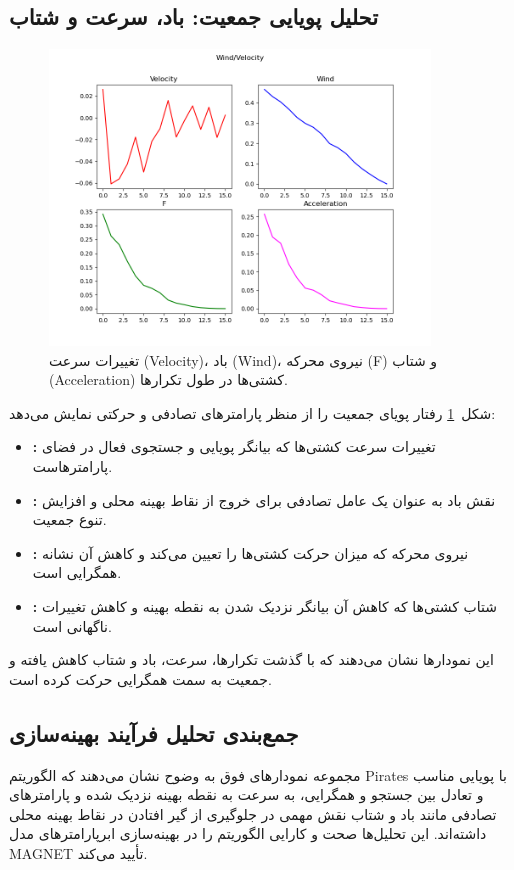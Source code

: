 \subsection{تحلیل پویایی جمعیت: باد، سرعت و شتاب}
\begin{figure}[h!]
    \centering
    \includegraphics[width=0.9\textwidth]{images/pirates_wind_velocity.png}
    \caption{تغییرات سرعت (Velocity)، باد (Wind)، نیروی محرکه (F) و شتاب (Acceleration) کشتی‌ها در طول تکرارها.}
    \label{fig:pirates_wind_velocity}
\end{figure}

شکل~\ref{fig:pirates_wind_velocity} رفتار پویای جمعیت را از منظر پارامترهای تصادفی و حرکتی نمایش می‌دهد:
\begin{itemize}
    \item \textbf{:} تغییرات سرعت کشتی‌ها که بیانگر پویایی و جستجوی فعال در فضای پارامترهاست.
    \item \textbf{:} نقش باد به عنوان یک عامل تصادفی برای خروج از نقاط بهینه محلی و افزایش تنوع جمعیت.
    \item \textbf{:} نیروی محرکه که میزان حرکت کشتی‌ها را تعیین می‌کند و کاهش آن نشانه همگرایی است.
    \item \textbf{:} شتاب کشتی‌ها که کاهش آن بیانگر نزدیک شدن به نقطه بهینه و کاهش تغییرات ناگهانی است.
\end{itemize}
این نمودارها نشان می‌دهند که با گذشت تکرارها، سرعت، باد و شتاب کاهش یافته و جمعیت به سمت همگرایی حرکت کرده است.

\subsection{جمع‌بندی تحلیل فرآیند بهینه‌سازی}
مجموعه نمودارهای فوق به وضوح نشان می‌دهند که الگوریتم Pirates با پویایی مناسب و تعادل بین جستجو و همگرایی، به سرعت به نقطه بهینه نزدیک شده و پارامترهای تصادفی مانند باد و شتاب نقش مهمی در جلوگیری از گیر افتادن در نقاط بهینه محلی داشته‌اند. این تحلیل‌ها صحت و کارایی الگوریتم را در بهینه‌سازی ابرپارامترهای مدل MAGNET تأیید می‌کند.


